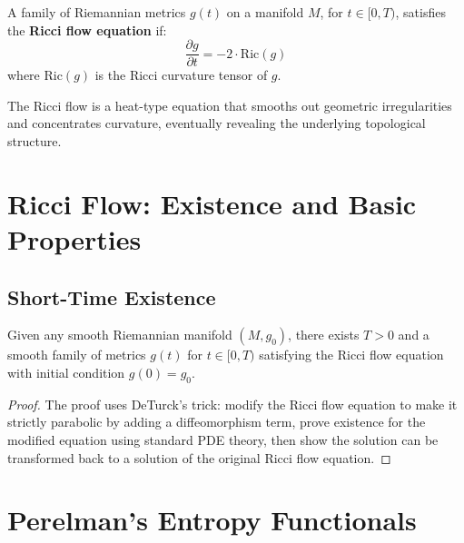 \begin{definition}
\label{def:ricci_flow}
\leanok
A family of Riemannian metrics $g(t)$ on a manifold $M$, for $t \in [0,T)$, satisfies the \textbf{Ricci flow equation} if:
\[
\frac{\partial g}{\partial t} = -2 \cdot \text{Ric}(g)
\]
where $\text{Ric}(g)$ is the Ricci curvature tensor of $g$.
\end{definition}

The Ricci flow is a heat-type equation that smooths out geometric irregularities and concentrates curvature, eventually revealing the underlying topological structure.

\chapter{Ricci Flow: Existence and Basic Properties}
\label{chap:ricci_flow}

\section{Short-Time Existence}

\begin{theorem}
\label{thm:deturck_existence}
\leanok
{}
Given any smooth Riemannian manifold $(M, g_0)$, there exists $T > 0$ and a smooth family of metrics $g(t)$ for $t \in [0, T)$ satisfying the Ricci flow equation with initial condition $g(0) = g_0$.
\end{theorem}

\begin{proof}
The proof uses DeTurck's trick: modify the Ricci flow equation to make it strictly parabolic by adding a diffeomorphism term, prove existence for the modified equation using standard PDE theory, then show the solution can be transformed back to a solution of the original Ricci flow equation.
\end{proof}

\chapter{Perelman's Entropy Functionals}
\label{chap:entropy}

